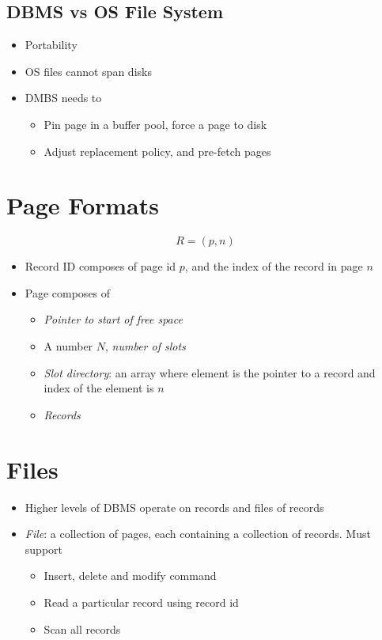   \subsection{DBMS vs OS File System}

    \begin{itemize}
      \item Portability
      \item OS files cannot span disks
      \item DMBS needs to
      \begin{itemize}
        \item Pin page in a buffer pool, force a page to disk
        \item Adjust replacement policy, and pre-fetch pages
      \end{itemize}
    \end{itemize}

\section{Page Formats}

  \begin{equation}
    R = (p, n)
  \end{equation}

  \begin{itemize}
    \item Record ID composes of page id $ p $, and the index of the record in
    page $ n $
    \item Page composes of
    \begin{itemize}
      \item \emph{Pointer to start of free space}
      \item A number $ N $, \emph{number of slots}
      \item \emph{Slot directory}: an array where element is the pointer to
      a record and index of the element is $ n $
      \item \emph{Records}
    \end{itemize}
  \end{itemize}

\section{Files}

  \begin{itemize}
    \item Higher levels of DBMS operate on records and files of records
    \item \emph{File}: a collection of pages, each containing a collection
    of records. Must support
    \begin{itemize}
      \item Insert, delete and modify command
      \item Read a particular record using record id
      \item Scan all records
    \end{itemize}
  \end{itemize}

